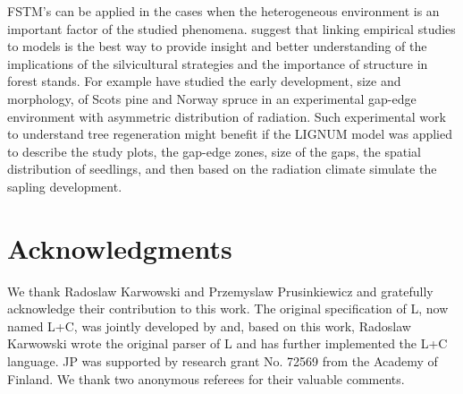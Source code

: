 FSTM's can be applied in  the cases when the heterogeneous environment
is  an important  factor of  the studied  phenomena. \citet{coates:03}
suggest that  linking empirical studies to  models is the  best way to
provide insight  and better understanding  of the implications  of the
silvicultural  strategies and  the importance  of structure  in forest
stands.   For  example   \citet{chantal:03}  have  studied  the  early
development, size and  morphology, of Scots pine and  Norway spruce in
an experimental  gap-edge environment with  asymmetric distribution of
radiation.  Such  experimental work  to  understand tree  regeneration
might benefit  if the LIGNUM model  was applied to  describe the study
plots, the gap-edge zones, size  of the gaps, the spatial distribution
of seedlings,  and then  based on the  radiation climate  simulate the
sapling development.


\section{Acknowledgments}

We   thank  Radoslaw  Karwowski   and  Przemyslaw   Prusinkiewicz  and
gratefully acknowledge their contribution  to this work.  The original
specification  of   L,  now  named  L+C,  was   jointly  developed  by
\citet{pp:99a} and,  based on this work, Radoslaw  Karwowski wrote the
original parser of L and  has further implemented the L+C language. JP
was supported by research grant No. 72569 from the Academy of Finland.
We thank two anonymous referees for their valuable comments.